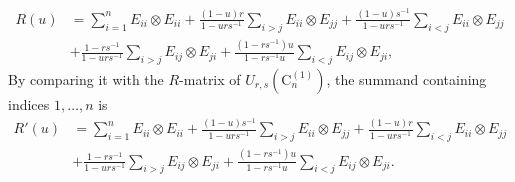 \documentclass[10pt,a4paper]{amsart}
\numberwithin{equation}{section}
\begin{document}
 $$
 \begin{aligned}
 	R(u) & =\sum_{i=1}^n E_{i i} \otimes E_{i i}+\frac{(1-u) r}{1-u r s^{-1}} \sum_{i>j} E_{i i} \otimes E_{j j}+\frac{(1-u) s^{-1}}{1-u r s^{-1}} \sum_{i<j} E_{i i} \otimes E_{j j} \\
 	& +\frac{1-r s^{-1}}{1-u r s^{-1}} \sum_{i>j} E_{i j} \otimes E_{j i}+\frac{\left(1-r s^{-1}\right) u}{1-r s^{-1} u} \sum_{i<j} E_{i j} \otimes E_{j i} ,
 \end{aligned}
 $$
 By comparing it with the $R$-matrix of $U_{r, s}(\mathrm{C}_n^{(1)})$, the summand containing indices $1, \ldots, n$ is
 $$
 \begin{aligned}
 	R'(u) & =\sum_{i=1}^n E_{i i} \otimes E_{i i}+\frac{(1-u) s^{-1}}{1-u rs^{-1}} \sum_{i>j} E_{i i} \otimes E_{j j}+\frac{(1-u) r}{1-u r s^{-1}} \sum_{i<j} E_{i i} \otimes E_{j j} \\
 	& +\frac{1-r s^{-1}}{1-u r s^{-1}} \sum_{i>j} E_{i j} \otimes E_{j i}+\frac{\left(1-r s^{-1}\right) u}{1-r s^{-1} u} \sum_{i<j} E_{i j} \otimes E_{j i} .
 \end{aligned}
 $$
\end{document}
